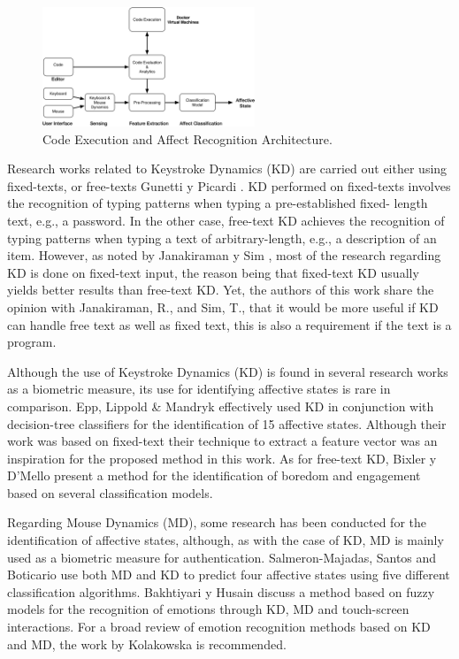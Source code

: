 \documentclass[conference]{IEEEtran}
\begin{document}
\begin{figure}[!t] 
\centering 
\includegraphics[width=2.5in]{KMDAffective.png} 
\caption{Code Execution and Affect Recognition Architecture.}
\label{fig_process} 
\end{figure}


Research works related to Keystroke Dynamics (KD) are carried out either using
fixed-texts, or free-texts Gunetti y Picardi \cite{gunetti2005keystroke}.
KD performed on fixed-texts
involves the recognition of typing patterns when typing a pre-established fixed-
length text, e.g., a password. In the other case, free-text KD achieves the
recognition of typing patterns when typing a text of arbitrary-length, e.g., a
description of an item. However, as noted by Janakiraman y Sim \cite{janakiraman2007keystroke},
most of
the research regarding KD is done on fixed-text input, the reason being that
fixed-text KD usually yields better results than free-text KD. Yet, the authors
of this work share the opinion with Janakiraman, R., and Sim, T., that it would
be more useful if KD can handle free text as well as fixed text, this is also a
requirement if the text is a program.

Although the use of Keystroke Dynamics (KD) is found in several research works
as a biometric measure, its use for identifying affective states is rare in
comparison. Epp, Lippold \& Mandryk \cite{epp2011identifying} effectively used KD in conjunction
with decision-tree classifiers for the identification of 15 affective states.
Although their work was based on fixed-text their technique to extract a feature
vector was an inspiration for the proposed method in this work. As for free-text
KD, Bixler y D'Mello \cite{bixler2013detecting} present a method for the identification of boredom
and engagement based on several classification models.

Regarding Mouse Dynamics (MD), some research has been conducted for the
identification of affective states, although, as with the case of KD, MD is
mainly used as a biometric measure for authentication. Salmeron-Majadas, Santos
and Boticario \cite{salmeron2014exploring} use both MD and KD to predict four affective states using
five different classification algorithms. Bakhtiyari y Husain \cite{bakhtiyari2014fuzzy} discuss a
method based on fuzzy models for the recognition of emotions through KD, MD and
touch-screen interactions. For a broad review of emotion recognition methods
based on KD and MD, the work by Kolakowska \cite{kolakowska2013review} is recommended.
\end{document}
